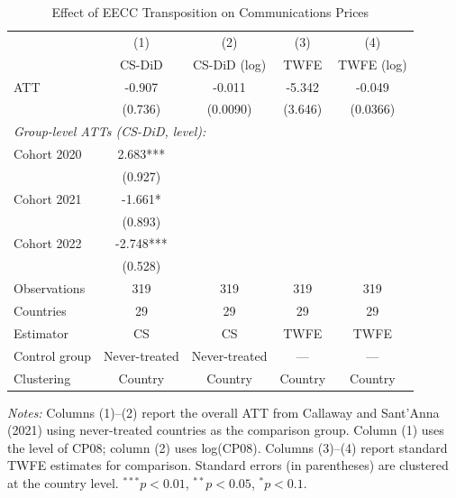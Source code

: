\begin{table}[htbp]
\centering
\caption{Effect of EECC Transposition on Communications Prices}
\label{tab:main}
\begin{tabular}{lcccc}
\hline\hline
 & (1) & (2) & (3) & (4) \\
 & CS-DiD & CS-DiD (log) & TWFE & TWFE (log) \\
\hline
ATT & -0.907 & -0.011 & -5.342 & -0.049 \\
 & (0.736) & (0.0090) & (3.646) & (0.0366) \\
[6pt]
\multicolumn{5}{l}{\textit{Group-level ATTs (CS-DiD, level):}} \\[3pt]
\quad Cohort 2020 & 2.683*** & & & \\
 & (0.927) & & & \\
\quad Cohort 2021 & -1.661* & & & \\
 & (0.893) & & & \\
\quad Cohort 2022 & -2.748*** & & & \\
 & (0.528) & & & \\
[6pt]
Observations & 319 & 319 & 319 & 319 \\
Countries & 29 & 29 & 29 & 29 \\
Estimator & CS & CS & TWFE & TWFE \\
Control group & Never-treated & Never-treated & --- & --- \\
Clustering & Country & Country & Country & Country \\
\hline\hline
\end{tabular}
\begin{tablenotes}[flushleft]
\small
\item \textit{Notes:} Columns (1)--(2) report the overall ATT from Callaway and Sant'Anna (2021) using never-treated countries as the comparison group. Column (1) uses the level of CP08; column (2) uses log(CP08). Columns (3)--(4) report standard TWFE estimates for comparison. Standard errors (in parentheses) are clustered at the country level. $^{***}p<0.01$, $^{**}p<0.05$, $^{*}p<0.1$.
\end{tablenotes}
\end{table}
